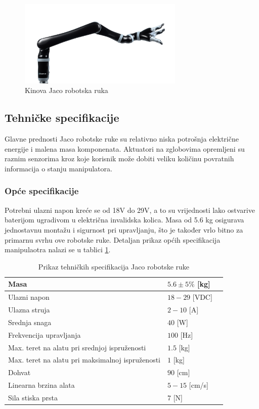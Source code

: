 \documentclass[times, utf8, diplomski, numeric]{fer}
\begin{document}
\begin{figure}[h!]
\centering
\includegraphics[width = 0.7\textwidth]{JACO2}
\caption{Kinova Jaco robotska ruka} \label{JACO2}
\end{figure}

\subsection{Tehničke specifikacije}
Glavne prednosti Jaco robotske ruke su relativno niska potrošnja električne energije i malena masa komponenata.
Aktuatori na zglobovima opremljeni su raznim senzorima kroz koje korisnik može dobiti veliku količinu povratnih informacija o stanju manipulatora.


\subsubsection{Opće specifikacije}
Potrebni ulazni napon kreće se od 18V do 29V,  a to su vrijednosti lako ostvarive baterijom ugradivom u električna invalidska kolica.
Masa od 5.6 kg osigurava jednostavnu montažu i sigurnost pri upravljanju, što je također vrlo bitno za primarnu svrhu ove robotske ruke.
Detaljan prikaz općih specifikacija manipulaotra nalazi se u tablici \ref{jaco_spec}.

\begin{table}[h!]
    \centering
    \begin{tabular}{ | l | l | l |}
    \hline
    Masa & $5.6 \pm 5\%$ [kg] \\ \hline
    Ulazni napon  & $18 - 29$ [VDC] \\ \hline
    Ulazna struja & $2 - 10$ [A] \\ \hline
    Srednja snaga & $40$ [W] \\ \hline
    Frekvencija upravljanja & $100$ [Hz] \\ \hline
    Max. teret na alatu pri srednjoj ispruženosti & $1.5$  [kg]  \\ \hline
    Max. teret na alatu pri maksimalnoj ispruženosti  & $1$ [kg]\\ \hline
    Dohvat & $90$  [cm] \\ \hline
    Linearna brzina alata & $5 - 15$ [cm/s]\\ \hline
    Sila stiska prsta & $7$ [N] \\ \hline
    \end{tabular}
    \caption{Prikaz tehničkih specifikacija Jaco robotske ruke} \label{jaco_spec}
\end{table}
\end{document}
